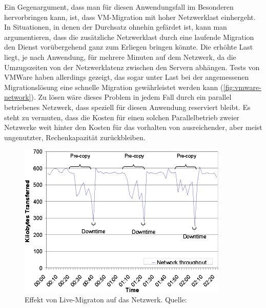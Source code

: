 Ein Gegenargument, dass man für diesen Anwendungsfall im Besonderen
hervorbringen kann, ist, dass \ac{VM}-Migration mit hoher Netzwerklast
einhergeht. In Situationen, in denen der Durchsatz ohnehin gefärdet
ist, kann man argumentieren, dass die zusätzliche Netzwerklast durch
eine laufende Migration den Dienst vorübergehend ganz zum Erliegen
bringen könnte. Die erhöhte Last liegt, je nach Anwendung, für mehrere
Minuten auf dem Netzwerk, da die Umzugszeiten von der Netzwerklatenz
zwischen den Servern abhängen. Tests von VMWare haben allerdings
gezeigt, das sogar unter Last bei der angemessenen Migrationslösung
eine schnelle Migration gewährleistet werden kann
(\autoref{fig:vmware-network}). Zu lösen wäre dieses Problem in jedem
Fall durch ein parallel betriebenes Netzwerk, dass speziell für diesen
Anwendung reserviert bleibt. Es steht zu vermuten, dass die Kosten für
einen solchen Parallelbetrieb zweier Netzwerke weit hinter den Kosten
für das vorhalten von ausreichender, aber meist ungenutzter,
Rechenkapazität zurückbleiben.
\begin{figure}[b]
  \centering
  \includegraphics[width=0.9\linewidth]{images/vmware-network}
  \caption{Effekt von Live-Migraton auf das
    Netzwerk. Quelle:~\cite{nelson2005fast}}
  \label{fig:vmware-network}
\end{figure}

